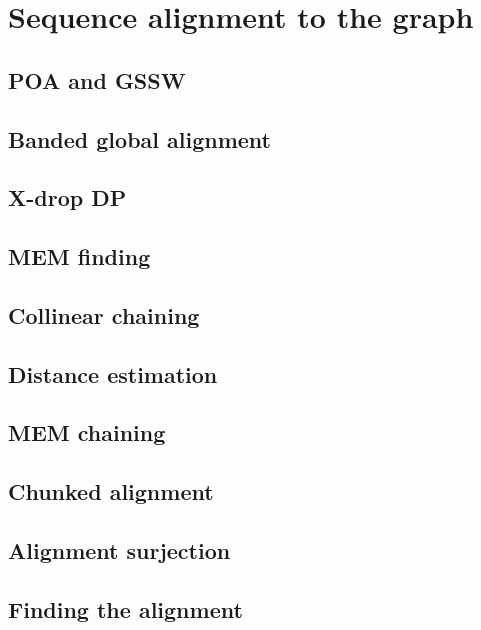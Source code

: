 \section{Sequence alignment to the graph}

\subsection{POA and GSSW}

\subsection{Banded global alignment}

\subsection{X-drop DP}

\subsection{MEM finding}


\subsection{Collinear chaining}

\subsection{Distance estimation}

\subsection{MEM chaining}

\subsection{Chunked alignment}

\subsection{Alignment surjection}


\subsection{Finding the alignment}

